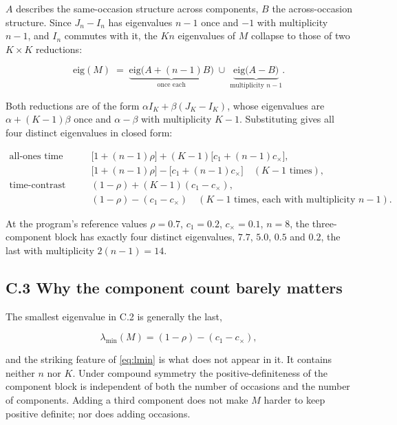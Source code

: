 \documentclass[
  11pt,
]{article}
\begin{document}
\(A\) describes the same-occasion structure across components, \(B\) the
across-occasion structure. Since \(J_n - I_n\) has eigenvalues \(n-1\)
once and \(-1\) with multiplicity \(n-1\), and \(I_n\) commutes with it,
the \(Kn\) eigenvalues of \(M\) collapse to those of two \(K \times K\)
reductions:

\[
\mathrm{eig}(M) \;=\;
\underbrace{\mathrm{eig}\bigl(A + (n-1)B\bigr)}_{\text{once each}}
\;\cup\;
\underbrace{\mathrm{eig}\bigl(A - B\bigr)}_{\text{multiplicity } n-1}.
\]

Both reductions are of the form \(\alpha I_K + \beta (J_K - I_K)\),
whose eigenvalues are \(\alpha + (K-1)\beta\) once and \(\alpha - \beta\)
with multiplicity \(K-1\). Substituting gives all four distinct
eigenvalues in closed form:

\[
\begin{aligned}
\text{all-ones time direction:}\quad
&\bigl[1 + (n-1)\rho\bigr] + (K-1)\bigl[c_1 + (n-1)c_{\times}\bigr],\\
&\bigl[1 + (n-1)\rho\bigr] - \bigl[c_1 + (n-1)c_{\times}\bigr]
  \quad (K-1 \text{ times}),\\[4pt]
\text{time-contrast directions:}\quad
&(1-\rho) + (K-1)(c_1 - c_{\times}),\\
&(1-\rho) - (c_1 - c_{\times})
  \quad (K-1 \text{ times, each with multiplicity } n-1).
\end{aligned}
\]

At the program's reference values \(\rho = 0.7\), \(c_1 = 0.2\),
\(c_{\times} = 0.1\), \(n = 8\), the three-component block has exactly
four distinct eigenvalues, \(7.7\), \(5.0\), \(0.5\) and \(0.2\), the last
with multiplicity \(2(n-1) = 14\).

\subsection{C.3 Why the component count barely matters}

The smallest eigenvalue in C.2 is generally the last,

\begin{equation}
\lambda_{\min}(M) = (1-\rho) - (c_1 - c_{\times}),
\label{eq:lmin}
\end{equation}

and the striking feature of \eqref{eq:lmin} is what does not appear
in it. It contains neither \(n\) nor \(K\). Under compound symmetry the
positive-definiteness of the component block is independent of both
the number of occasions and the number of components. Adding a third
component does not make \(M\) harder to keep positive definite; nor
does adding occasions.
\end{document}
